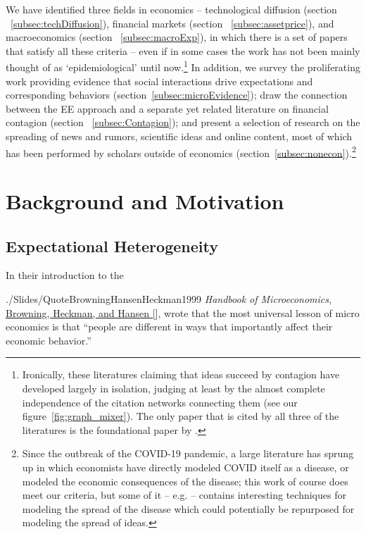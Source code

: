 We have identified three fields in economics -- technological diffusion (section ~\ref{subsec:techDiffusion}), financial markets (section ~\ref{subsec:assetprice}), and macroeconomics (section ~\ref{subsec:macroExp}), in which there is a set of papers that satisfy all these criteria -- even if in some cases the work has not been mainly thought of as `epidemiological' until now.\footnote{Ironically, these literatures claiming that ideas succeed by contagion have developed largely in isolation, judging at least by the almost complete independence of the citation networks connecting them (see our figure~\ref{fig:graph_mixer}). The only paper that is cited by all three of the literatures is the foundational paper by \cite{kermack_contribution_1927}.}  In addition, we survey the proliferating work providing evidence that social interactions drive expectations and corresponding behaviors (section~\ref{subsec:microEvidence}); draw the connection between the EE approach and a separate yet related literature on financial contagion (section ~\ref{subsec:Contagion}); and present a selection of research on the spreading of news and rumors, scientific ideas and online content, most of which has been performed by scholars outside of economics (section~\ref{subsec:nonecon}).\footnote{Since the outbreak of the COVID-19 pandemic, a large literature has sprung up in which economists have directly modeled COVID itself as a disease, or modeled the economic consequences of the disease; this work of course does meet our criteria, but some of it -- e.g. \cite{gourieroux2020time} -- contains interesting techniques for modeling the spread of the disease which could potentially be repurposed for modeling the spread of ideas.}

\section{Background and Motivation}\label{motivation-and-context}

\subsection{Expectational Heterogeneity}\label{EpiExpHet}\hypertarget{EpiExpHet}{}

In their introduction to the
\begin{verbatimwrite}{./Slides/QuoteBrowningHansenHeckman1999}%
  \textit{Handbook of Microeconomics}, \href{http://larspeterhansen.org/wp-content/uploads/2016/11/Microdata-and-GE-Models.pdf}{Browning, Heckman, and Hansen [\citeyear{browning_chapter_1999}}], wrote that the most universal lesson of micro economics is that ``people are different in ways that importantly affect their economic behavior.''
\end{verbatimwrite}%

